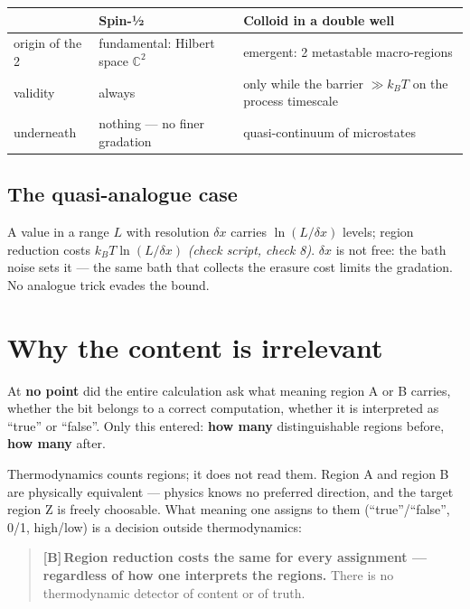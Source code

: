 \documentclass[11pt,a4paper]{article}
\newcommand{\LB}{\textcolor{layB}{\textbf{\footnotesize\textsf{[B]}}}\,}
\newcommand{\pruef}[1]{{\small\itshape(check script, #1)}}
\begin{document}
\begin{center}
\small
\begin{tabular}{@{}p{}p{}p{}@{}}
\toprule
 & \textbf{Spin-½} & \textbf{Colloid in a double well} \\
\midrule
origin of the 2 & fundamental: Hilbert space $\mathbb{C}^2$ & emergent: 2 metastable macro-regions \\
validity & always & only while the barrier $\gg k_B T$ on the process timescale \\
underneath & nothing --- no finer gradation & quasi-continuum of microstates \\
\bottomrule
\end{tabular}
\end{center}

\subsection{The quasi-analogue case}

A value in a range $L$ with resolution $\delta x$ carries $\ln(L/\delta x)$
levels; region reduction costs $k_B T \ln(L/\delta x)$ \pruef{check 8}. $\delta x$
is not free: the bath noise sets it --- the same bath that collects the erasure
cost limits the gradation. No analogue trick evades the bound.

\section{Why the content is irrelevant}
\label{sec:content}

At \textbf{no point} did the entire calculation ask what meaning region A or B
carries, whether the bit belongs to a correct computation, whether it is
interpreted as “true” or “false”. Only this entered: \textbf{how many}
distinguishable regions before, \textbf{how many} after.

Thermodynamics counts regions; it does not read them. Region A and region B are
physically equivalent --- physics knows no preferred direction, and the target
region Z is freely choosable. What meaning one assigns to them
(“true”/“false”, 0/1, high/low) is a decision outside thermodynamics:

\begin{quote}
\LB \textbf{Region reduction costs the same for every assignment --- regardless of
how one interprets the regions.} There is no thermodynamic detector of content or
of truth.
\end{quote}
\end{document}
